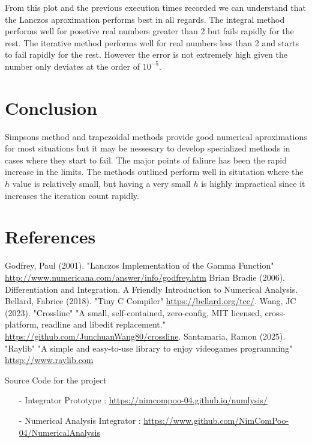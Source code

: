 \documentclass[12pt]{article}
\begin{document}
From this plot and the previous execution times recorded we can understand that the Lanczos aproximation performs best in all regards.
The integral method performs well for posetive real numbers greater than 2 but fails rapidly for the rest. The iterative method performs
well for real numbers less than 2 and starts to fail rapidly for the rest. However the error is not extremely high given the number only 
deviates at the order of $10^{-5}$.

\pagebreak
\section{Conclusion}

Simpsons method and trapezoidal methods provide good numerical aproximations for most situations but it may be nessesary to develop specialized
methods in cases where they start to fail. The major points of faliure has been the rapid increase in the limits. The methods outlined perform
well in situtation where the $h$ value is relatively small, but having a very small $h$ is highly impractical since it increases the iteration
count rapidly.

\section{References}
\begin{thebibliography}{2}
	 Godfrey, Paul (2001). "Lanczos Implementation of the Gamma Function" \url{http://www.numericana.com/answer/info/godfrey.htm}
	 Brian Bradie (2006). Differentiation and Integration. A Friendly Introduction to Numerical Analysis.
	 Bellard, Fabrice (2018). "Tiny C Compiler" \url{https://bellard.org/tcc/}.
	 Wang, JC (2023). "Crossline" "A small, self-contained, zero-config, MIT licensed, cross-platform, readline and libedit replacement." \url{https://github.com/JunchuanWang80/crossline}.
	 Santamaria, Ramon (2025). "Raylib" "A simple and easy-to-use library to enjoy videogames programming" \url{httsp://www.raylib.com}
\end{thebibliography}

\begin{flushleft}
	\begin{bf}
		\large
		Source Code for the project
	\end{bf}
	\begin{itemize}
		\item[-] Integrator Prototype : \url{https://nimcompoo-04.github.io/numlysis/}
		\item[-] Numerical Analysis Integrator : \url{https://www.github.com/NimComPoo-04/NumericalAnalysis}
	\end{itemize}
\end{flushleft}
\end{document}
